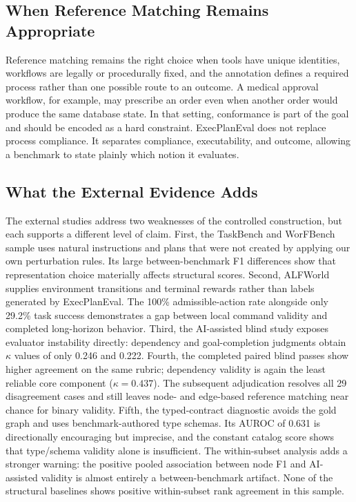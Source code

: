 \documentclass[10pt]{article}
\begin{document}
\subsection{When Reference Matching Remains Appropriate}
Reference matching remains the right choice when tools have unique identities,
workflows are legally or procedurally fixed, and the annotation defines a
required process rather than one possible route to an outcome. A medical
approval workflow, for example, may prescribe an order even when another order
would produce the same database state. In that setting, conformance is part of
the goal and should be encoded as a hard constraint. ExecPlanEval does not
replace process compliance. It separates compliance, executability, and
outcome, allowing a benchmark to state plainly which notion it evaluates.

\subsection{What the External Evidence Adds}
The external studies address two weaknesses of the controlled construction,
but each supports a different level of claim.
First, the TaskBench and WorFBench sample uses natural instructions and plans that
were not created by applying our own perturbation rules. Its large
between-benchmark F1 differences show that representation choice materially
affects structural scores. Second, ALFWorld supplies environment transitions
and terminal rewards rather than labels generated by ExecPlanEval. The 100\%
admissible-action rate alongside only 29.2\% task success demonstrates a gap
between local command validity and completed long-horizon behavior. Third, the
AI-assisted blind study exposes evaluator instability directly: dependency and
goal-completion judgments obtain $\kappa$ values of only 0.246 and 0.222.
Fourth, the completed paired blind passes show higher agreement on the same
rubric; dependency validity is again the least reliable core component
($\kappa=0.437$). The subsequent adjudication resolves all 29 disagreement
cases and still leaves node- and edge-based reference matching near chance for
binary validity. Fifth, the typed-contract diagnostic avoids the gold graph and
uses benchmark-authored type schemas. Its AUROC of 0.631 is directionally
encouraging but imprecise, and the constant catalog score shows that type/schema
validity alone is insufficient.
The within-subset analysis adds a stronger warning: the positive pooled
association between node F1 and AI-assisted validity is almost entirely a
between-benchmark artifact. None of the structural baselines shows positive
within-subset rank agreement in this sample.
\end{document}
